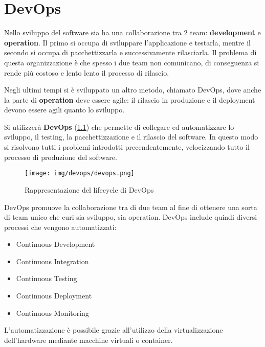 \chapter{DevOps}
Nello sviluppo del software sia ha una collaborazione tra 2 team: \textbf{development} e
\textbf{operation}. Il primo si occupa di sviluppare l'applicazione e testarla, mentre il
secondo si occupa di pacchettizzarla e successivamente rilasciarla. Il problema
di questa organizzazione è che spesso i due team non comunicano, di conseguenza 
si rende più costoso e lento lento il processo di rilascio.

Negli ultimi tempi si è sviluppato un altro metodo, chiamato DevOps, dove anche
la parte di \textbf{operation} deve essere agile: il rilascio in produzione e il
deployment devono essere agili quanto lo sviluppo.

Si utilizzerà \textbf{DevOps} (\ref{fig:devops}) che permette di collegare ed 
automatizzare lo sviluppo, il testing, la pacchettizzazione e il rilascio del software.
In questo modo si risolvono tutti i problemi introdotti precendentemente, velocizzando
tutto il processo di produzione del software.

\begin{figure}[!ht]
      \centering
      \texttt{[image: img/devops/devops.png]}
      \caption{Rappresentazione del lifecycle di DevOps}
      \label{fig:devops}
\end{figure}

DevOps promuove la collaborazione tra di due team al fine di ottenere una sorta
di team unico che curi sia sviluppo, sia operation. DevOps include quindi diversi
processi che vengono automatizzati:
\begin{itemize}
      \item Continuous Development
      \item Continuous Integration
      \item Continuous Testing
      \item Continuous Deployment
      \item Continuous Monitoring
\end{itemize}
L'automatizzazione è possibile grazie all'utilizzo della virtualizzazione dell'hardware
mediante macchine virtuali o container.


